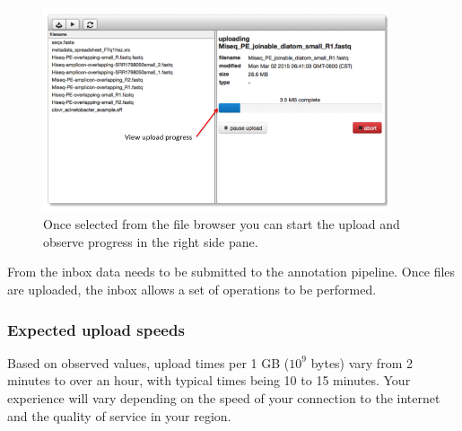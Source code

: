 \documentclass[12pt,fullpage]{report}
\begin{document}
\begin{figure}
\begin{center}
\includegraphics[width=4in]{Images/upload_progress.png}
\end{center}
\label{fig:upload_progress}
\caption{Once selected from the file browser you can start the upload and observe progress in the right side pane.}
\end{figure}

From the inbox data needs to be submitted to the annotation pipeline. Once files are uploaded, the inbox allows a set of operations to be performed.








\subsubsection*{Expected upload speeds}
Based on observed values, upload times per 1 GB ($10^9$ bytes) vary from 2 minutes to over an hour, with typical times being 10 to 15 minutes. Your experience will vary depending on the speed of your connection to the internet and the quality of service in your region.
\end{document}
